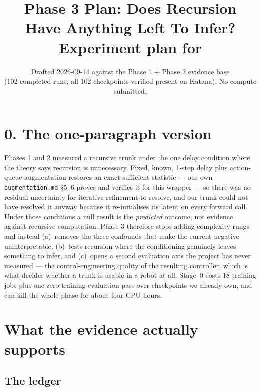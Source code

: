 \documentclass[11pt]{article}
\title{Phase 3 Plan: Does Recursion Have Anything Left To Infer?\\[4pt]
\large Experiment plan for \code{trm-delay-robust-scaling}}
\author{}
\date{Drafted 2026-09-14 against the Phase 1 + Phase 2 evidence base\\
(102 completed runs; all 102 checkpoints verified present on Katana). No compute submitted.}
\newcommand{\code}[1]{\texttt{\small #1}}
\begin{document}
\maketitle
{\small\tableofcontents}
\bigskip

\section*{0. The one-paragraph version}

Phases 1 and 2 measured a recursive trunk under the one delay condition where the theory says recursion is unnecessary. Fixed, known, 1-step delay plus action-queue augmentation restores an exact sufficient statistic --- our own \code{augmentation.md} \S5--6 proves and verifies it for this wrapper --- so there was no residual uncertainty for iterative refinement to resolve, and our trunk could not have resolved it anyway because it re-initialises its latent on every forward call. Under those conditions a null result is the \emph{predicted} outcome, not evidence against recursive computation. Phase 3 therefore stops adding complexity rungs and instead (a)~removes the three confounds that make the current negative uninterpretable, (b)~tests recursion where the conditioning genuinely leaves something to infer, and (c)~opens a second evaluation axis the project has never measured --- the control-engineering quality of the resulting controller, which is what decides whether a trunk is usable in a robot at all. Stage~0 costs 18 training jobs plus one zero-training evaluation pass over checkpoints we already own, and can kill the whole phase for about four CPU-hours.

\section{What the evidence actually supports}

\subsection{The ledger}
\end{document}
